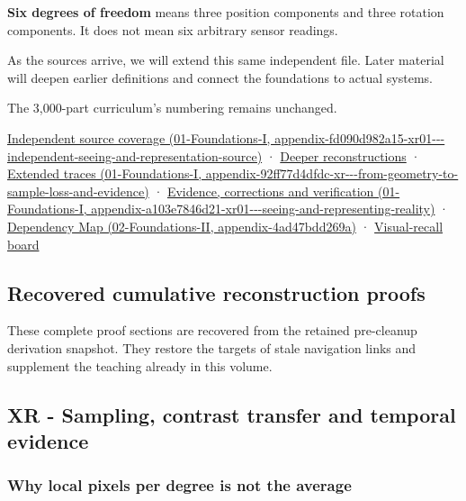 \textbf{Six degrees of freedom} means three position components and three rotation components. It does not mean six arbitrary sensor readings.

As the sources arrive, we will extend this same independent file. Later material will deepen earlier definitions and connect the foundations to actual systems.

The 3,000-part curriculum's numbering remains unchanged.

\href{../01-Foundations-I/main.pdf\#nameddest=appendix-fd090d982a15-xr01---independent-seeing-and-representation-source}{Independent source coverage (01-Foundations-I, appendix-fd090d982a15-xr01-\/-\/-independent-seeing-and-representation-source)} · \hyperref[04-visual-computing-ii-ch042-xr---sampling-contrast-transfer-and-temporal-evidence]{Deeper reconstructions} · \href{../01-Foundations-I/main.pdf\#nameddest=appendix-92ff77d4dfdc-xr---from-geometry-to-sample-loss-and-evidence}{Extended traces (01-Foundations-I, appendix-92ff77d4dfdc-xr-\/-\/-from-geometry-to-sample-loss-and-evidence)} · \href{../01-Foundations-I/main.pdf\#nameddest=appendix-a103e7846d21-xr01---seeing-and-representing-reality}{Evidence, corrections and verification (01-Foundations-I, appendix-a103e7846d21-xr01-\/-\/-seeing-and-representing-reality)} · \href{../02-Foundations-II/main.pdf\#nameddest=appendix-4ad47bdd269a}{Dependency Map (02-Foundations-II, appendix-4ad47bdd269a)} · \hyperref[appendix-73c6b8ed5a87]{Visual-recall board}

\subsection{Recovered cumulative reconstruction proofs}\label{04-visual-computing-ii-ch043-recovered-cumulative-reconstruction-proofs}

These complete proof sections are recovered from the retained pre-cleanup derivation snapshot. They restore the targets of stale navigation links and supplement the teaching already in this volume.

\subsection{XR - Sampling, contrast transfer and temporal evidence}\label{04-visual-computing-ii-ch043-xr---sampling-contrast-transfer-and-temporal-evidence}

\subsubsection{Why local pixels per degree is not the average}\label{04-visual-computing-ii-ch043-why-local-pixels-per-degree-is-not-the-average}

